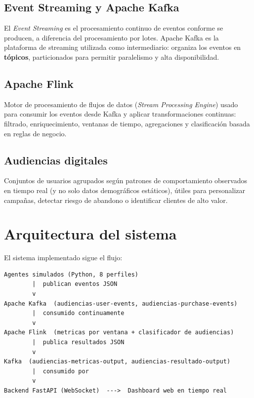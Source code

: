 \documentclass[11pt,a4paper]{article}
\begin{document}
\subsection{Event Streaming y Apache Kafka}
El \emph{Event Streaming} es el procesamiento continuo de eventos
conforme se producen, a diferencia del procesamiento por lotes. Apache
Kafka es la plataforma de streaming utilizada como intermediario:
organiza los eventos en \textbf{tópicos}, particionados para permitir
paralelismo y alta disponibilidad.

\subsection{Apache Flink}
Motor de procesamiento de flujos de datos (\emph{Stream Processing
Engine}) usado para consumir los eventos desde Kafka y aplicar
transformaciones continuas: filtrado, enriquecimiento, ventanas de
tiempo, agregaciones y clasificación basada en reglas de negocio.

\subsection{Audiencias digitales}
Conjuntos de usuarios agrupados según patrones de comportamiento
observados en tiempo real (y no solo datos demográficos estáticos), útiles
para personalizar campañas, detectar riesgo de abandono o identificar
clientes de alto valor.

\section{Arquitectura del sistema}

El sistema implementado sigue el flujo:

\begin{center}
\begin{verbatim}
Agentes simulados (Python, 8 perfiles)
        |  publican eventos JSON
        v
Apache Kafka  (audiencias-user-events, audiencias-purchase-events)
        |  consumido continuamente
        v
Apache Flink  (metricas por ventana + clasificador de audiencias)
        |  publica resultados JSON
        v
Kafka  (audiencias-metricas-output, audiencias-resultado-output)
        |  consumido por
        v
Backend FastAPI (WebSocket)  --->  Dashboard web en tiempo real
\end{verbatim}
\end{center}
\end{document}
